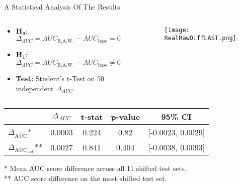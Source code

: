 \begin{frame}{A Statistical Analysis Of The Results}
    \begin{columns}[T]
        \begin{column}{0.59\textwidth}
            \vspace{1em}
            \begin{itemize}
                \item $\boldsymbol{H_0}$: $\Delta_{AUC} =  AUC_{\text{R.A.W.}} - AUC_{\text{base}} = 0$ \\        
                \item $\boldsymbol{H_1}$: $\Delta_{AUC} = AUC_{\text{R.A.W.}} - AUC_{\text{base}} \neq 0$ \\
                
                
                \item \textbf{Test:} Student's t-Test on 50 independent $\Delta_{AUC}$.
            \end{itemize}
            
            
            
            
        \end{column}
        
        \begin{column}{0.41\textwidth}
            \vspace{1em}
            \begin{figure}
                \centering
                \texttt{[image: RealRawDiffLAST.png]}
            \end{figure}
        \end{column}
    \end{columns}

    \begin{table}
        \centering
        \small
        \begin{tabular}{lcccc}
            \toprule
            & $\Delta_{AUC}$ & t-stat & p-value & 95\% CI \\
            \midrule
            $\Delta_{\overline{\text{AUC}}}$* & 0.0003 & 0.224  & 0.82 & [-0.0023, 0.0029] \\
            $\Delta_{\text{AUC}_{\text{last}}}$** & 0.0027 & 0.841 & 0.404 & [-0.0038, 0.0093] \\
            \bottomrule
        \end{tabular}
    \end{table}
    
    \begin{footnotesize}
        * Mean AUC score difference across all 11 shifted test sets. \\
        ** AUC score difference on the most shifted test set.
    \end{footnotesize}
\end{frame}


    
